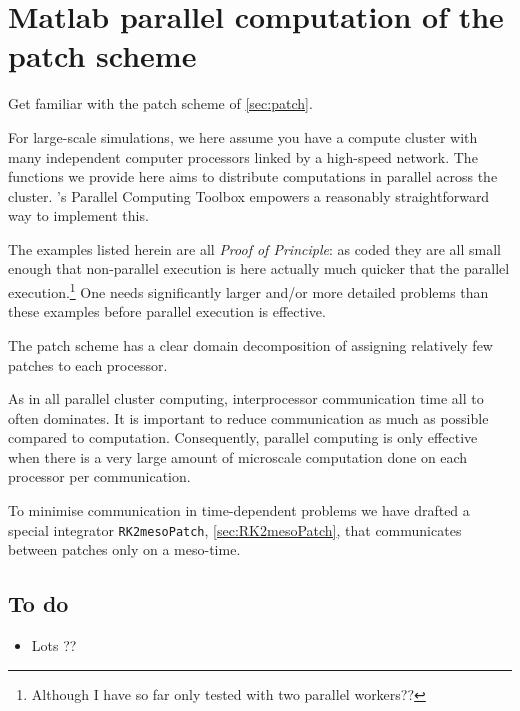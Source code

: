 \chapter{Matlab parallel computation of the patch scheme}
\label{sec:parallel}
\localtableofcontents


Get familiar with the patch scheme of \cref{sec:patch}.

For large-scale simulations, we here assume you have a
compute cluster with many independent computer processors
linked by a high-speed network. The functions we provide
here aims to distribute computations in parallel across the
cluster. \Matlab's Parallel Computing Toolbox empowers a
reasonably straightforward way to implement this.

The examples listed herein are all \emph{Proof of
Principle}: as coded they are all small enough that
non-parallel execution is here actually much quicker that
the parallel execution.\footnote{Although I have so far only
tested with two parallel workers??}  One needs significantly
larger and/or more detailed problems than these examples
before parallel execution is effective.

The patch scheme has a clear domain decomposition of
assigning relatively few patches to each processor.

As in all parallel cluster computing, interprocessor
communication time all to often dominates.  It is important
to reduce communication as much as possible compared to
computation.  Consequently, parallel computing is only
effective when there is a very large amount of microscale
computation done on each processor per communication.

To minimise communication in time-dependent problems we have
drafted a special integrator \verb|RK2mesoPatch|, 
\cref{sec:RK2mesoPatch}, that communicates between patches
only on a meso-time.










\begin{devMan}





\section{To do}
\begin{itemize}
\item Lots ??
\end{itemize}

\end{devMan}
